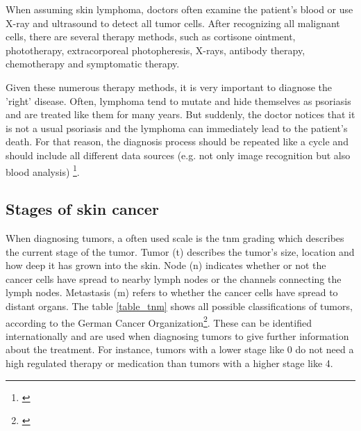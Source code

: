 When assuming skin lymphoma, doctors often examine the patient's blood or use X-ray and ultrasound to detect all tumor cells. 
After recognizing all malignant cells, there are several therapy methods, such as cortisone ointment, phototherapy, extracorporeal photopheresis, X-rays, antibody therapy, chemotherapy and symptomatic therapy.

Given these numerous therapy methods, it is very important to diagnose the 'right' disease. Often, lymphoma tend to mutate and hide themselves as psoriasis and are treated like them for many years. But suddenly, the doctor notices that it is not a usual psoriasis and the lymphoma can immediately lead to the patient's death. For that reason, the diagnosis process should be repeated like a cycle and should include all different data sources (e.g. not only image recognition but also blood analysis) \footnote{\cite{ndr_lymphom}}. 

\subsection{Stages of skin cancer}

When diagnosing tumors, a often used scale is the \ac{tnm} grading which describes the current stage of the tumor. 
Tumor (t) describes the tumor's size, location and how deep it has grown into the skin. Node (n) indicates whether or not the cancer cells have spread to nearby lymph nodes or the channels connecting the lymph nodes. Metastasis (m) refers to whether the cancer cells have spread to distant organs.
The table \ref{table_tnm} shows all possible classifications of tumors, according to the German Cancer Organization\footnote{\cite{dkgs_tumor_classification}}. These can be identified internationally and are used when diagnosing tumors to give further information about the treatment. For instance, tumors with a lower stage like 0 do not need a high regulated therapy or medication than tumors with a higher stage like 4.

